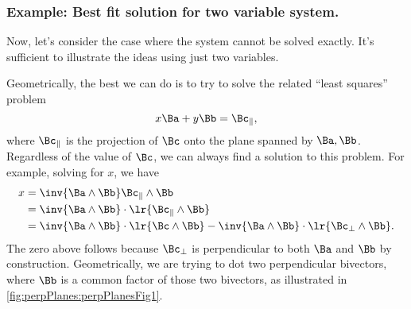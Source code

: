\subsubsection{Example: Best fit solution for two variable system.}
Now, let's consider the case where the system cannot be solved exactly.  It's sufficient to illustrate the ideas using just two variables.

Geometrically, the best we can do is to try to solve the related ``least squares'' problem
\begin{equation}\label{eqn:solutionOfLinearSystem:1480}
x \Ba + y \Bb = \Bc_\parallel,
\end{equation}
where \( \Bc_\parallel \) is the projection of \( \Bc \) onto the plane spanned by \( \Ba, \Bb \).  Regardless of the value of \( \Bc \), we can always find a solution to this problem.  For example, solving for \( x \), we have
\begin{equation}\label{eqn:solutionOfLinearSystem:1500}
\begin{aligned}
x
&= \inv{ \Ba \wedge \Bb } \Bc_\parallel \wedge \Bb \\
&= \inv{ \Ba \wedge \Bb } \cdot \lr{ \Bc_\parallel \wedge \Bb } \\
&= \inv{ \Ba \wedge \Bb } \cdot \lr{ \Bc \wedge \Bb } - \inv{ \Ba \wedge \Bb } \cdot \lr{ \Bc_\perp \wedge \Bb }.
\end{aligned}
\end{equation}
The zero above follows because \( \Bc_\perp \) is perpendicular to both \( \Ba \) and \( \Bb \) by construction.  Geometrically, we are trying to dot two perpendicular bivectors, where \( \Bb \) is a common factor of those two bivectors, as illustrated in \cref{fig:perpPlanes:perpPlanesFig1}.

